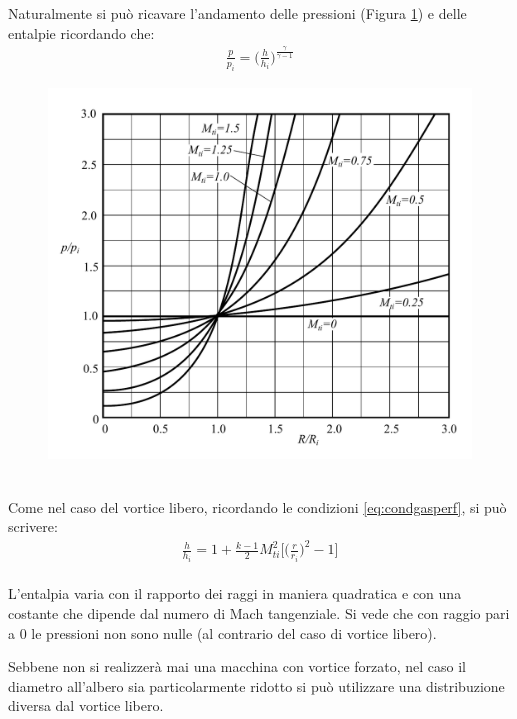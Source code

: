 Naturalmente si può ricavare l'andamento delle pressioni (Figura \ref{fig:PVortForz}) e delle entalpie ricordando che:
\begin{align*}
\frac{p}{p_i} = \Bigg(\frac{h}{h_i}\Bigg)^{\frac{\gamma}{\gamma-1}}
\end{align*}
\begin{figure}
\centering
  \includegraphics[width=.8\textwidth]{fig/PVortForz.pdf}
\caption{}
\label{fig:PVortForz}
\end{figure}
\\Come nel caso del vortice libero, ricordando le condizioni \ref{eq:condgasperf}, si può scrivere:
\begin{align*}
\boxed{\frac{h}{h_i} = 1 + \frac{k-1}{2} M_{ti}^2 \bigg[ \bigg(\frac{r}{r_i} \bigg)^2-1 \bigg]}
\end{align*}
\\L'entalpia varia con il rapporto dei raggi in maniera quadratica e con una costante che dipende dal numero di Mach tangenziale. Si vede che con raggio pari a $0$ le pressioni non sono nulle (al contrario del caso di vortice libero).

Sebbene non si realizzerà mai una macchina con vortice forzato, nel caso il diametro all'albero sia particolarmente ridotto si può utilizzare una distribuzione diversa dal vortice libero. 
